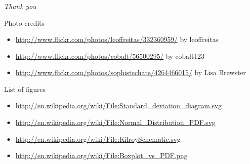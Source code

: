 \documentclass{beamer}
\newcommand{\innersplash}[1]{
  \begin{center}
    \Large \textrm{\textit{ #1 } }
  \end{center}
}
\newcommand{\splashslide}[2][{}]{
  \begin{frame}
  \frametitle{#1}
  \innersplash{#2}
  \end{frame}
}
\begin{document}
\splashslide{\Huge Thank you }

\begin{frame}{Photo credits}
  \small{
  \begin{itemize}
  \item \href{http://www.flickr.com/photos/leoffreitas/332360959/}{http://www.flickr.com/photos/leoffreitas/332360959/} by leoffreitas
  \item \href{http://www.flickr.com/photos/cobalt/56500295/}{http://www.flickr.com/photos/cobalt/56500295/} by cobalt123
  \item \href{http://www.flickr.com/photos/sophistechate/4264466015/}{http://www.flickr.com/photos/sophistechate/4264466015/} by Lisa Brewster
  \end{itemize}
  }
\end{frame}

\begin{frame}{List of figures}
  \small{
  \begin{itemize}
  \item \href{http://en.wikipedia.org/wiki/File:Standard_deviation_diagram.svg}{http://en.wikipedia.org/wiki/File:Standard\_deviation\_diagram.svg}
  \item \href{http://en.wikipedia.org/wiki/File:Normal_Distribution_PDF.svg}{http://en.wikipedia.org/wiki/File:Normal\_Distribution\_PDF.svg}
  \item \href{http://en.wikipedia.org/wiki/File:KilroySchematic.svg}{http://en.wikipedia.org/wiki/File:KilroySchematic.svg}
  \item \href{http://en.wikipedia.org/wiki/File:Boxplot_vs_PDF.png}{http://en.wikipedia.org/wiki/File:Boxplot\_vs\_PDF.png}
  \end{itemize}
  }
\end{frame}
\end{document}
